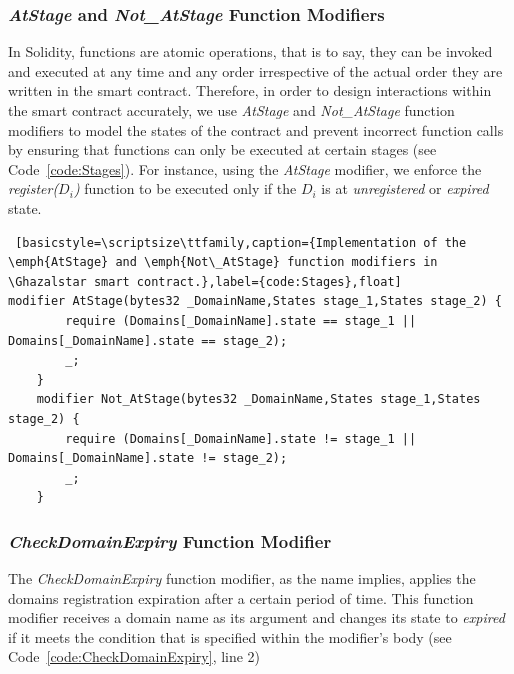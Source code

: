\subsubsection*{\emph{AtStage} and \emph{Not\_AtStage} Function Modifiers}

In Solidity, functions are atomic operations, that is to say, they can be invoked and executed at any time and any order irrespective of the actual order they are written in the smart contract. Therefore, in order to design interactions within the \Ghazalstar smart contract accurately, we use \emph{AtStage} and \emph{Not\_AtStage} function modifiers to model the states of the contract and prevent incorrect function calls by ensuring that functions can only be executed at certain stages (see Code~\ref{code:Stages}). For instance, using the \emph{AtStage} modifier, we enforce the \emph{register($D_i$)} function to be executed only if the $D_i$ is at \emph{unregistered} or \emph{expired} state.

\begin{lstlisting} [basicstyle=\scriptsize\ttfamily,caption={Implementation of the \emph{AtStage} and \emph{Not\_AtStage} function modifiers in \Ghazalstar smart contract.},label={code:Stages},float]
modifier AtStage(bytes32 _DomainName,States stage_1,States stage_2) {
        require (Domains[_DomainName].state == stage_1 ||     Domains[_DomainName].state == stage_2);
        _;
    }
    modifier Not_AtStage(bytes32 _DomainName,States stage_1,States stage_2) { 
        require (Domains[_DomainName].state != stage_1 ||     Domains[_DomainName].state != stage_2);
        _;
    }
\end{lstlisting}
\subsubsection*{\textit{CheckDomainExpiry} Function Modifier}

The \emph{CheckDomainExpiry} function modifier, as the name implies, applies the domains registration expiration after a certain period of time. This function modifier receives a domain name as its argument and changes its state to \emph{expired} if it meets the condition that is specified within the modifier's body (see Code~\ref{code:CheckDomainExpiry}, line 2)

